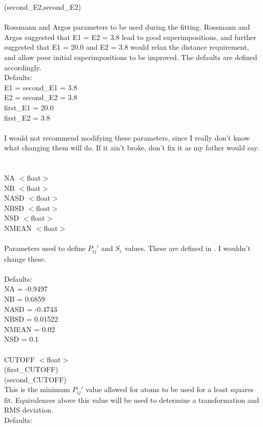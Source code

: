 (second\_E2,second\_E2)\\
\\
Rossmann and Argos parameters to be used during the fitting.
Rossmann and Argos suggested that E1 = E2 = 3.8 lead to good
superimpositions, and further suggested that E1 = 20.0 and E2 = 3.8
would relax the distance requirement, and allow poor initial
superimpositions to be improved.  The defaults are defined
accordingly.
\\
Defaults:\\
 E1 = second\_E1 = 3.8\\
 E2 = second\_E2 = 3.8\\
 first\_E1 = 20.0\\
 first\_E2 =  3.8\\
\\
I would not recommend modifying these parameters, since I really
don't know what changing them will do.  If it ain't broke, don't
fix it as my father would say.\\
\\
\\
NA    $<$float$>$\\
NB    $<$float$>$\\
NASD  $<$float$>$\\
NBSD  $<$float$>$\\
NSD   $<$float$>$\\
NMEAN $<$float$>$\\
\\
Parameters used to define $P_{ij}{\prime}$ and $S_{c}$ values.  These are 
defined in \cite{rb92b}.  I wouldn't change these. \\
\\
Defaults:\\
  NA    = -0.9497\\
  NB    =  0.6859\\
  NASD  = -0.4743\\
  NBSD  =  0.01522\\
  NMEAN =  0.02\\
  NSD   =  0.1\\
\\
CUTOFF $<$float$>$\\
(first\_CUTOFF)\\
(second\_CUTOFF)\\
This is the minimum $P_{ij}{\prime}$ value allowed for atoms to be used 
for a  least squares fit.  Equivalences above this value will be used to
determine a transformation and RMS deviation.\\
Defaults:\\

